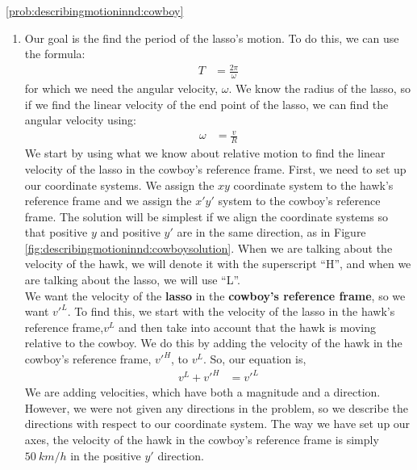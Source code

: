 \newpage
\begin{solution}{\ref{prob:describingmotioninnd:cowboy}}{
\begin{enumerate}[label=\alph*)]
\item Our goal is the find the period of the lasso's motion. To do this, we can use the formula: 
\begin{align*}
T&=\frac{2\pi}{\omega}
\end{align*}
for which we need the angular velocity, $\omega$. We know the radius of the lasso, so if we find the linear velocity of the end point of the lasso, we can find the angular velocity using:
\begin{align*}
\omega&=\frac{v}{R}
\end{align*}
We start by using what we know about relative motion to find the linear velocity of the lasso in the cowboy's reference frame. First, we need to set up our coordinate systems. We assign the $xy$ coordinate system to the hawk's reference frame and we assign the $x'y'$ system to the cowboy's reference frame. The solution will be simplest if we align the coordinate systems so that positive $y$ and positive $y'$ are in the same direction, as in Figure \ref{fig:describingmotioninnd:cowboysolution}. When we are talking about the velocity of the hawk, we will denote it with the superscript ``H'', and when we are talking about the lasso, we will use ``L''.\\

We want the velocity of the \textbf{lasso} in the \textbf{cowboy's reference frame}, so we want $v'^L$. To find this, we start with the velocity of the lasso in the hawk's reference frame,$v^L$ and then take into account that the hawk is moving relative to the cowboy. We do this by adding the velocity of the hawk in the cowboy's reference frame, $v'^H$, to $v^L$. So, our equation is,
\begin{align*}
v^L+v'^H&=v'^L
\end{align*}
We are adding velocities, which have both a magnitude and a direction. However, we were not given any directions in the problem, so we describe the directions with respect to our coordinate system. The way we have set up our axes, the velocity of the hawk in the cowboy's reference frame is simply $\SI{50}{km/h}$ in the positive $y'$ direction.\\


\end{enumerate}}
\end{solution}
